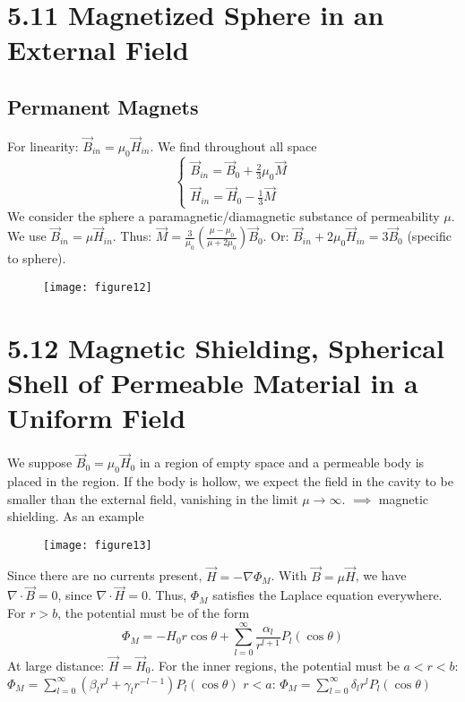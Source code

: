 \documentclass{article}
\begin{document}
	\section*{5.11 Magnetized Sphere in an External Field}
	\subsection*{Permanent Magnets}
	For linearity: $\vec{B}_{in} = \mu_0 \vec{H}_{in}$.
	We find throughout all space
	$$ \left\{ \begin{array}{l} \vec{B}_{in} = \vec{B}_0 + \frac{2}{3}\mu_0 \vec{M} \\ \vec{H}_{in} = \vec{H}_0 - \frac{1}{3}\vec{M} \end{array} \right. $$
	We consider the sphere a paramagnetic/diamagnetic substance of permeability $\mu$.
	We use $\vec{B}_{in} = \mu \vec{H}_{in}$.
	Thus: $\vec{M} = \frac{3}{\mu_0}(\frac{\mu-\mu_0}{\mu+2\mu_0})\vec{B}_0$.
	Or: $\vec{B}_{in} + 2\mu_0 \vec{H}_{in} = 3\vec{B}_0$ (specific to sphere).
	
	\begin{figure}[h]
		\centering
		\texttt{[image: figure12]}
		\caption{}
		\label{fig:figure12}
	\end{figure}
	
	\section*{5.12 Magnetic Shielding, Spherical Shell of Permeable Material in a Uniform Field}
	We suppose $\vec{B}_0 = \mu_0 \vec{H}_0$ in a region of empty space and a permeable body is placed in the region.
	If the body is hollow, we expect the field in the cavity to be smaller than the external field, vanishing in the limit $\mu \to \infty$. $\implies$ magnetic shielding.
	As an example 
	
	\begin{figure}[h]
		\centering
		\texttt{[image: figure13]}
		\caption{}
		\label{fig:figure13}
	\end{figure}
	
	Since there are no currents present, $\vec{H}=-\nabla \Phi_M$.
	With $\vec{B}=\mu \vec{H}$, we have $\nabla \cdot \vec{B}=0$, since $\nabla \cdot \vec{H}=0$.
	Thus, $\Phi_M$ satisfies the Laplace equation everywhere.
	For $r>b$, the potential must be of the form
	$$ \Phi_M = -H_0 r \cos\theta + \sum_{l=0}^{\infty} \frac{\alpha_l}{r^{l+1}} P_l(\cos\theta) $$
	At large distance: $\vec{H} = \vec{H}_0$.
	For the inner regions, the potential must be
	$a<r<b$: $\Phi_M = \sum_{l=0}^{\infty} (\beta_l r^l + \gamma_l r^{-l-1}) P_l(\cos\theta)$
	$r<a$: $\Phi_M = \sum_{l=0}^{\infty} \delta_l r^l P_l(\cos\theta)$
	
\end{document}
